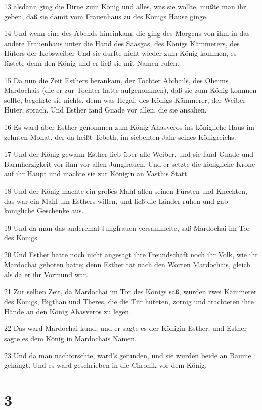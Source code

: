 \par 13 alsdann ging die Dirne zum König und alles, was sie wollte, mußte man ihr geben, daß sie damit vom Frauenhaus zu des Königs Hause ginge.
\par 14 Und wenn eine des Abends hineinkam, die ging des Morgens von ihm in das andere Frauenhaus unter die Hand des Saasgas, des Königs Kämmerers, des Hüters der Kebsweiber Und sie durfte nicht wieder zum König kommen, es lüstete denn den König und er ließ sie mit Namen rufen.
\par 15 Da nun die Zeit Esthers herankam, der Tochter Abihails, des Oheims Mardochais (die er zur Tochter hatte aufgenommen), daß sie zum König kommen sollte, begehrte sie nichts, denn was Hegai, des Königs Kämmerer, der Weiber Hüter, sprach. Und Esther fand Gnade vor allen, die sie ansahen.
\par 16 Es ward aber Esther genommen zum König Ahasveros ins königliche Haus im zehnten Monat, der da heißt Tebeth, im siebenten Jahr seines Königreichs.
\par 17 Und der König gewann Esther lieb über alle Weiber, und sie fand Gnade und Barmherzigkeit vor ihm vor allen Jungfrauen. Und er setzte die königliche Krone auf ihr Haupt und machte sie zur Königin an Vasthis Statt.
\par 18 Und der König machte ein großes Mahl allen seinen Fürsten und Knechten, das war ein Mahl um Esthers willen, und ließ die Länder ruhen und gab königliche Geschenke aus.
\par 19 Und da man das anderemal Jungfrauen versammelte, saß Mardochai im Tor des Königs.
\par 20 Und Esther hatte noch nicht angesagt ihre Freundschaft noch ihr Volk, wie ihr Mardochai geboten hatte; denn Esther tat nach den Worten Mardochais, gleich als da er ihr Vormund war.
\par 21 Zur selben Zeit, da Mardochai im Tor des Königs saß, wurden zwei Kämmerer des Königs, Bigthan und Theres, die die Tür hüteten, zornig und trachteten ihre Hände an den König Ahasveros zu legen.
\par 22 Das ward Mardochai kund, und er sagte es der Königin Esther, und Esther sagte es dem König in Mardochais Namen.
\par 23 Und da man nachforschte, ward's gefunden, und sie wurden beide an Bäume gehängt. Und es ward geschrieben in die Chronik vor dem König.

\chapter{3}

